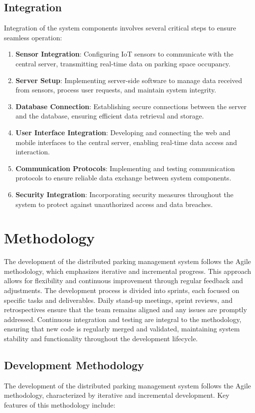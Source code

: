 \documentclass[oneside, 12pt, a4paper, draft]{book}
\begin{document}
\section{Integration}
\label{sec:org9a97dbb}
Integration of the system components involves several critical steps to ensure seamless operation:

\begin{enumerate}
\item \textbf{\textbf{Sensor Integration}}: Configuring IoT sensors to communicate with the central server, transmitting real-time data on parking space occupancy.
\item \textbf{\textbf{Server Setup}}: Implementing server-side software to manage data received from sensors, process user requests, and maintain system integrity.
\item \textbf{\textbf{Database Connection}}: Establishing secure connections between the server and the database, ensuring efficient data retrieval and storage.
\item \textbf{\textbf{User Interface Integration}}: Developing and connecting the web and mobile interfaces to the central server, enabling real-time data access and interaction.
\item \textbf{\textbf{Communication Protocols}}: Implementing and testing communication protocols to ensure reliable data exchange between system components.
\item \textbf{\textbf{Security Integration}}: Incorporating security measures throughout the system to protect against unauthorized access and data breaches.
\end{enumerate}
\chapter{Methodology}
\label{sec:org18d0116}
The development of the distributed parking management system follows the Agile methodology, which emphasizes iterative and incremental progress. This approach allows for flexibility and continuous improvement through regular feedback and adjustments. The development process is divided into sprints, each focused on specific tasks and deliverables. Daily stand-up meetings, sprint reviews, and retrospectives ensure that the team remains aligned and any issues are promptly addressed. Continuous integration and testing are integral to the methodology, ensuring that new code is regularly merged and validated, maintaining system stability and functionality throughout the development lifecycle.
\section{Development Methodology}
\label{sec:org66977f2}
The development of the distributed parking management system follows the Agile methodology, characterized by iterative and incremental development. Key features of this methodology include:
\end{document}
